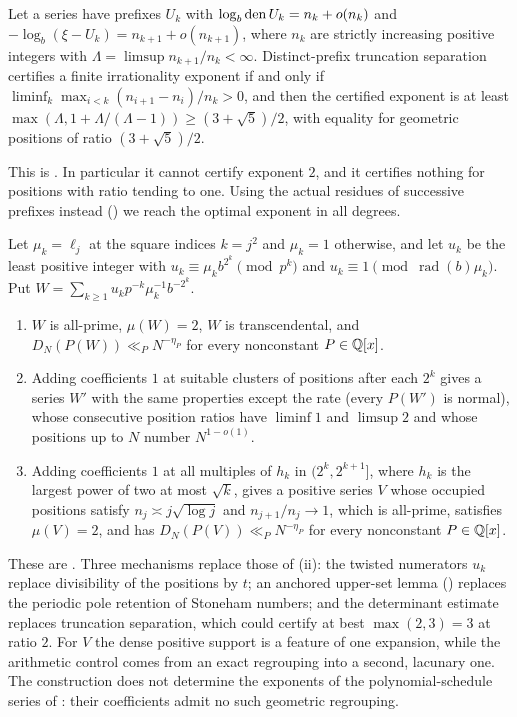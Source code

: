 \documentclass[11pt]{article}
\DeclareMathOperator{\rad}{rad}
\begin{document}
\begin{maintheorem}\label{thm:D}
Let a series have prefixes $U_k$ with $\log_b\operatorname{den} U_k=n_k+o(n_k)$ and $-\log_b(\xi-U_k)=n_{k+1}+o(n_{k+1})$, where $n_k$ are
strictly increasing positive integers with $\Lambda=\limsup n_{k+1}/n_k<\infty$. Distinct-prefix truncation
separation certifies a finite irrationality exponent if and only if
$\liminf_k\max_{i<k}(n_{i+1}-n_i)/n_k>0$, and then the certified exponent is at least
$\max(\Lambda,1+\Lambda/(\Lambda-1))\ge(3+\sqrt5)/2$, with equality for geometric positions of ratio $(3+\sqrt5)/2$.
\end{maintheorem}

This is . In particular it cannot certify exponent $2$, and it certifies nothing for
positions with ratio tending to one. Using the actual residues of successive prefixes instead
() we reach the optimal exponent in all degrees.

\begin{maintheorem}\label{thm:E}
Let $\mu_k=\ell_j$ at the square indices $k=j^2$ and $\mu_k=1$ otherwise, and let $u_k$ be the least positive integer
with $u_k\equiv\mu_kb^{2^k}\pmod{p^k}$ and $u_k\equiv1\pmod{\rad(b)\mu_k}$. Put $W=\sum_{k\ge1}u_kp^{-k}\mu_k^{-1}b^{-2^k}$.
\begin{enumerate}[label=\textup{(\roman*)},nosep]
\item $W$ is all-prime, $\mu(W)=2$, $W$ is transcendental, and $D_N(P(W))\ll_PN^{-\eta_P}$ for every nonconstant
$P\in\mathbb Q[x]$.
\item Adding coefficients $1$ at suitable clusters of positions after each $2^k$ gives a series $W'$ with the same
properties except the rate (every $P(W')$ is normal), whose consecutive position ratios have $\liminf1$ and
$\limsup2$ and whose positions up to $N$ number $N^{1-o(1)}$.
\item Adding coefficients $1$ at all multiples of $h_k$ in $(2^k,2^{k+1}]$, where $h_k$ is the largest power of two at most
$\sqrt k$, gives a positive series $V$ whose occupied positions satisfy $n_j\asymp j\sqrt{\log j}$ and
$n_{j+1}/n_j\to1$, which is all-prime, satisfies $\mu(V)=2$, and has $D_N(P(V))\ll_PN^{-\eta_P}$ for every
nonconstant $P\in\mathbb Q[x]$.
\end{enumerate}
\end{maintheorem}

These are . Three mechanisms replace those of (ii): the twisted
numerators $u_k$ replace divisibility of the positions by $t$; an anchored upper-set lemma ()
replaces the periodic pole retention of Stoneham numbers; and the determinant estimate replaces truncation
separation, which could certify at best $\max(2,3)=3$ at ratio $2$. For $V$ the dense positive support is a
feature of one expansion, while the arithmetic control comes from an exact regrouping into a second, lacunary
one. The construction does not determine the exponents of the polynomial-schedule series of : their
coefficients admit no such geometric regrouping.
\end{document}
